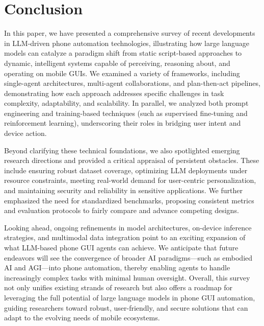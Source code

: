 \section{Conclusion}
\label{sec:conclusion}

In this paper, we have presented a comprehensive survey of recent developments in LLM-driven phone automation technologies, illustrating how large language models can catalyze a paradigm shift from static script-based approaches to dynamic, intelligent systems capable of perceiving, reasoning about, and operating on mobile GUIs. We examined a variety of frameworks, including single-agent architectures, multi-agent collaborations, and plan-then-act pipelines, demonstrating how each approach addresses specific challenges in task complexity, adaptability, and scalability. In parallel, we analyzed both prompt engineering and training-based techniques (such as supervised fine-tuning and reinforcement learning), underscoring their roles in bridging user intent and device action.

Beyond clarifying these technical foundations, we also spotlighted emerging research directions and provided a critical appraisal of persistent obstacles. These include ensuring robust dataset coverage, optimizing LLM deployments under resource constraints, meeting real-world demand for user-centric personalization, and maintaining security and reliability in sensitive applications. We further emphasized the need for standardized benchmarks, proposing consistent metrics and evaluation protocols to fairly compare and advance competing designs.

Looking ahead, ongoing refinements in model architectures, on-device inference strategies, and multimodal data integration point to an exciting expansion of what LLM-based phone GUI agents can achieve. We anticipate that future endeavors will see the convergence of broader AI paradigms—such as embodied AI and AGI—into phone automation, thereby enabling agents to handle increasingly complex tasks with minimal human oversight. Overall, this survey not only unifies existing strands of research but also offers a roadmap for leveraging the full potential of large language models in phone GUI automation, guiding researchers toward robust, user-friendly, and secure solutions that can adapt to the evolving needs of mobile ecosystems.
